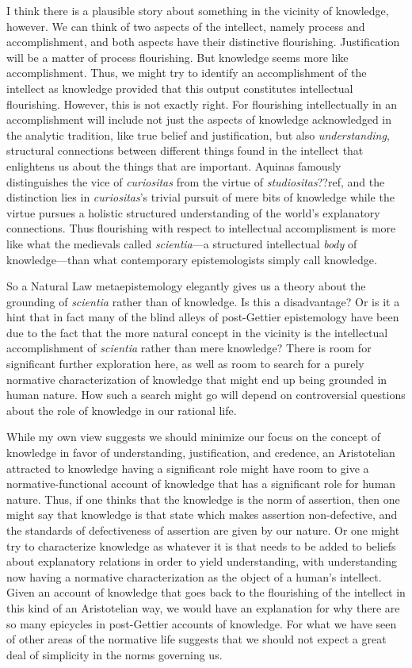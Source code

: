 I think there is a plausible story about something in the vicinity of knowledge, however. We can think of two aspects of the
intellect, namely process and accomplishment, and both aspects have their distinctive flourishing. Justification will be a matter of
process flourishing. But knowledge seems more like accomplishment. Thus, we might try to identify an accomplishment of the intellect as 
knowledge provided that this output constitutes intellectual flourishing. However, this is not exactly right. For flourishing
intellectually in an accomplishment will include not just the aspects of knowledge acknowledged in the analytic tradition, like true 
belief and justification, but also \textit{understanding}, structural connections between different things found in the intellect that
enlightens us about the things that are important. Aquinas famously distinguishes the vice of \textit{curiositas} from the virtue of
\textit{studiositas}??ref, and the distinction lies in \textit{curiositas}'s trivial pursuit of mere bits of knowledge while the virtue pursues a holistic
structured understanding of the world's explanatory connections. Thus flourishing with respect to intellectual accomplisment is more
like what the medievals called \textit{scientia}---a structured intellectual \textit{body} of knowledge---than what 
contemporary epistemologists simply call knowledge.

So a Natural Law metaepistemology elegantly gives us a theory about the grounding of \textit{scientia} rather than of knowledge. 
Is this a disadvantage? Or is it a hint that in fact many of the blind alleys of post-Gettier epistemology have been due to the
fact that the more natural concept in the vicinity is the intellectual accomplishment of \textit{scientia} rather than mere 
knowledge?  There is room for significant further exploration here, as well as room to search for a purely normative characterization
of knowledge that might end up being grounded in human nature. How such a search might go will depend on controversial questions about
the role of knowledge in our rational life. 

While my own view suggests we should minimize our focus on the concept of knowledge in favor of understanding, justification, and credence, 
an Aristotelian attracted to knowledge having a significant role might have room to give a normative-functional account of knowledge that
has a significant role for human nature. Thus, if one thinks that the knowledge is the norm of assertion, then one might say that
knowledge is that state which makes assertion non-defective, and the standards of defectiveness of assertion are given by our nature.
Or one might try to characterize knowledge as whatever it is that needs to be added to beliefs about explanatory relations in order to yield
understanding, with understanding now having a normative characterization as the object of a human's intellect.
Given an account of knowledge that goes back to the flourishing of the intellect in this kind of an Aristotelian way, we would have
an explanation for why there are so many epicycles in post-Gettier accounts of knowledge. For what we have seen of other areas of the
normative life suggests that we should not expect a great deal of simplicity in the norms governing us. 

